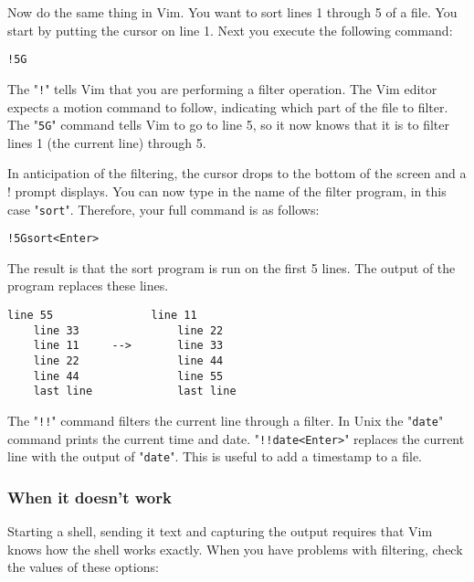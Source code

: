 Now do the same thing in Vim.
You want to sort lines 1 through 5 of a file.
You start by putting the cursor on line 1.
Next you execute the following command:

\begin{Verbatim}[samepage=true]
 !5G
\end{Verbatim}

The "\texttt{!}" tells Vim that you are performing a filter operation.
The Vim editor expects a motion command to follow, indicating which part of the file to filter.
The "\texttt{5G}" command tells Vim to go to line 5, so it now knows that it is to filter lines 1 (the current line) through 5.

In anticipation of the filtering, the cursor drops to the bottom of the screen and a ! prompt displays.
You can now type in the name of the filter program, in this case "\texttt{sort}".
Therefore, your full command is as follows:

\begin{Verbatim}[samepage=true]
 !5Gsort<Enter>
\end{Verbatim}

The result is that the sort program is run on the first 5 lines.
The output of the program replaces these lines.

\begin{Verbatim}[samepage=true]
    line 55               line 11
    line 33               line 22
    line 11     -->       line 33
    line 22               line 44
    line 44               line 55
    last line             last line
\end{Verbatim}

The "\texttt{!!}" command filters the current line through a filter.
In Unix the "\texttt{date}" command prints the current time and date.
"\texttt{!!date<Enter>}" replaces the current line with the output of "\texttt{date}".
This is useful to add a timestamp to a file.

\subsubsection{When it doesn't work}
Starting a shell, sending it text and capturing the output requires that Vim knows how the shell works exactly.
When you have problems with filtering, check the values of these options:

